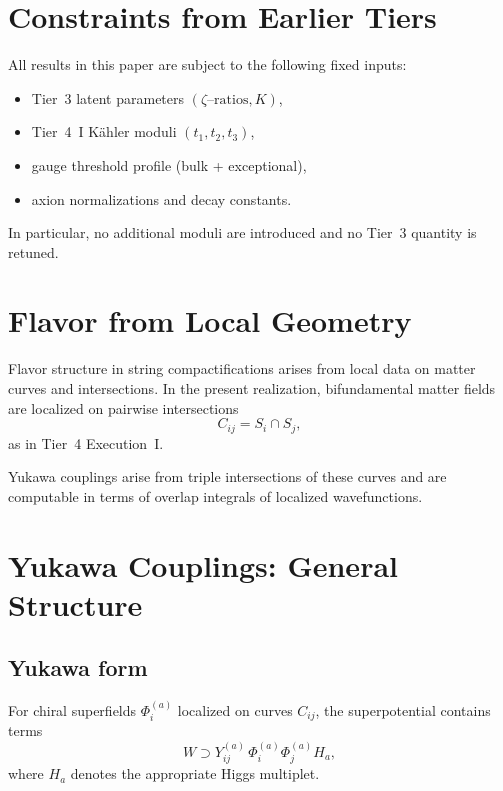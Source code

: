 \documentclass[11pt]{article}
\begin{document}
\section{Constraints from Earlier Tiers}

All results in this paper are subject to the following fixed inputs:
\begin{itemize}
  \item Tier~3 latent parameters $(\zeta\text{--ratios}, K)$,
  \item Tier~4~I K\"ahler moduli $(t_1,t_2,t_3)$,
  \item gauge threshold profile (bulk + exceptional),
  \item axion normalizations and decay constants.
\end{itemize}

\begin{remark}
In particular, no additional moduli are introduced and no Tier~3
quantity is retuned.
\end{remark}

\section{Flavor from Local Geometry}

Flavor structure in string compactifications arises from local data on
matter curves and intersections.
In the present realization, bifundamental matter fields are localized on
pairwise intersections
\[
C_{ij} = S_i \cap S_j,
\]
as in Tier~4 Execution~I.

Yukawa couplings arise from triple intersections of these curves and are
computable in terms of overlap integrals of localized wavefunctions.

\section{Yukawa Couplings: General Structure}

\subsection{Yukawa form}

For chiral superfields $\Phi^{(a)}_i$ localized on curves $C_{ij}$,
the superpotential contains terms
\begin{equation}
W \supset Y^{(a)}_{ij}\,
\Phi^{(a)}_{i}\Phi^{(a)}_{j}H_a ,
\end{equation}
where $H_a$ denotes the appropriate Higgs multiplet.
\end{document}
